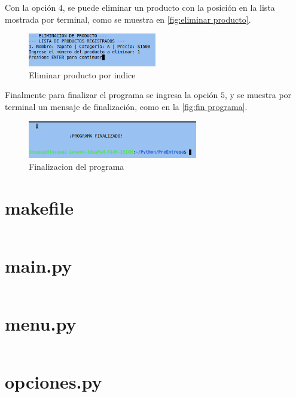 \documentclass[12pt]{article}
\begin{document}
Con la opción $4$, se puede eliminar un producto con la posición en la lista mostrada por terminal, como se muestra en \autoref{fig:eliminar producto}.

\begin{figure}[H]
	\centering
	\setlength{\fboxrule}{0pt}
	\includegraphics[width=0.5\textwidth]{Imagenes/img5.png}
	\caption{Eliminar producto por indice}
	\label{fig:eliminar producto}
\end{figure} 

Finalmente para finalizar el programa se ingresa la opción $5$, y se muestra por terminal un mensaje de finalización, como en la \autoref{fig:fin programa}.
\begin{figure}[H]
	\centering
	\setlength{\fboxrule}{0pt}
	\includegraphics[width=0.66\textwidth]{Imagenes/img6.png}
	\caption{Finalizacion del programa}
	\label{fig:fin programa}
\end{figure} 

\section{makefile}
\inputminted[fontsize=\small]{make}{Codigo/makefile}

\section{main.py}
\inputminted[fontsize=\small, breaklines=true]{python}{Codigo/main.py}

\section{menu.py}
\inputminted[fontsize=\small, breaklines=true]{python}{Codigo/menu.py}

\section{opciones.py}
\inputminted[fontsize=\small, breaklines=true]{python}{Codigo/opciones.py}
\end{document}
